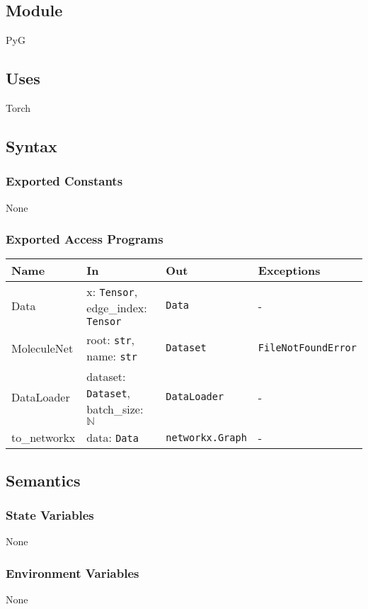 \documentclass[12pt, titlepage]{article}
\begin{document}
\subsection{Module}
PyG

\subsection{Uses}
Torch

\subsection{Syntax}

\subsubsection{Exported Constants}
None

\subsubsection{Exported Access Programs}

\begin{center}
\begin{tabular}{p{3.2cm} p{5.5cm} p{4cm} p{2.5cm}}
\hline
\textbf{Name} & \textbf{In} & \textbf{Out} & \textbf{Exceptions} \\
\hline
Data & x: \texttt{Tensor}, edge\_index: \texttt{Tensor} & \texttt{Data} & - \\
MoleculeNet & root: \texttt{str}, name: \texttt{str} & \texttt{Dataset} & \texttt{FileNotFoundError} \\
DataLoader & dataset: \texttt{Dataset}, batch\_size: \(\mathbb{N}\) & \texttt{DataLoader} & - \\
to\_networkx & data: \texttt{Data} & \texttt{networkx.Graph} & - \\
\hline
\end{tabular}
\end{center}

\subsection{Semantics}

\subsubsection{State Variables}
None

\subsubsection{Environment Variables}
None
\end{document}
